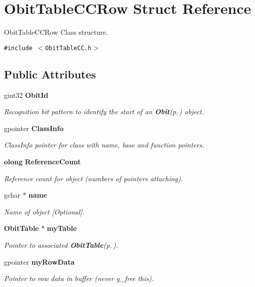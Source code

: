 \section{Obit\-Table\-CCRow Struct Reference}
\label{structObitTableCCRow}
Obit\-Table\-CCRow Class structure.  


{\tt \#include $<$Obit\-Table\-CC.h$>$}

\subsection*{Public Attributes}
\begin{CompactItemize}
\item 
gint32 {\bf Obit\-Id}
\begin{CompactList}\small\item\em Recognition bit pattern to identify the start of an {\bf Obit}{\rm (p.\,\pageref{structObit})} object. \item\end{CompactList}\item 
gpointer {\bf Class\-Info}
\begin{CompactList}\small\item\em Class\-Info pointer for class with name, base and function pointers. \item\end{CompactList}\item 
{\bf olong} {\bf Reference\-Count}
\begin{CompactList}\small\item\em Reference count for object (numbers of pointers attaching). \item\end{CompactList}\item 
gchar $\ast$ {\bf name}
\begin{CompactList}\small\item\em Name of object [Optional]. \item\end{CompactList}\item 
{\bf Obit\-Table} $\ast$ {\bf my\-Table}
\begin{CompactList}\small\item\em Pointer to associated {\bf Obit\-Table}{\rm (p.\,\pageref{structObitTable})}. \item\end{CompactList}\item 
gpointer {\bf my\-Row\-Data}
\begin{CompactList}\small\item\em Pointer to row data in buffer (never g\_\-free this). \item\end{CompactList}\item 

\end{CompactItemize}

